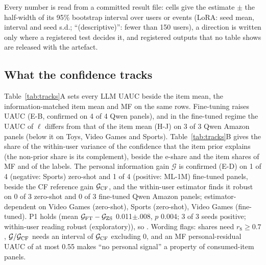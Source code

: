 Every number is read from a committed result file: cells give the estimate $\pm$ the half-width of its 95\% bootstrap interval
over users or events (LoRA: seed mean, interval and seed s.d.; ``(descriptive)'': fewer than 150 users), a direction is written only
where a registered test decides it, and registered outputs that no table shows are released with the artefact.

\subsection{What the confidence tracks}\label{sec:exp-tracks}\label{sec:exp-rq4}
Table~\ref{tab:tracks}A sets every LLM UAUC beside the item mean, the information-matched item mean and MF on the same rows.
Fine-tuning raises UAUC (E-B, confirmed on 4 of 4 Qwen panels), and
in the fine-tuned regime the UAUC of $\ell$ differs from that of the item mean (H-J) on 3 of 3 Qwen Amazon panels (below it on Toys, Video Games and Sports).
Table~\ref{tab:tracks}B gives the share of the within-user variance of the confidence that the item prior explains (the non-prior
share is its complement), beside the e-share and the item shares of MF and of the labels. The personal information gain
$\mathcal G$ is confirmed (E-D) on 1 of 4 (negative: Sports) zero-shot and 1 of 4 (positive: ML-1M) fine-tuned panels, beside the CF reference gain $\mathcal G_{\rm CF}$, and the within-user estimator finds it
robust on 0 of 3 zero-shot and 0 of 3 fine-tuned Qwen Amazon panels; estimator-dependent on Video Games (zero-shot), Sports (zero-shot), Video Games (fine-tuned). P1 holds (mean $\mathcal G_{\rm FT}-\mathcal G_{\rm ZS}$
0.011$\pm$.008, $p$ 0.004; 3 of 3 seeds positive; within-user reading robust (exploratory)), so
.
Wording flags: shares need $r_8\ge0.7$, $\mathcal G/\mathcal G_{\rm CF}$ needs an interval of $\mathcal G_{\rm CF}$ excluding 0, and an
MF personal-residual UAUC of at most 0.55 makes ``no personal signal'' a property of consumed-item panels.

